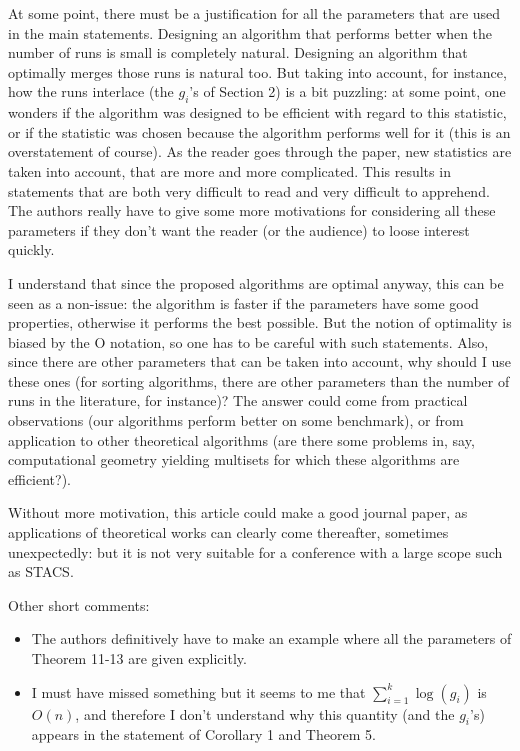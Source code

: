 \begin{appendices}
  At some point, there must be a justification for all the parameters
  that are used in the main statements. Designing an algorithm that
  performs better when the number of runs is small is completely
  natural. Designing an algorithm that optimally merges those runs is
  natural too. But taking into account, for instance, how the runs
  interlace (the $g_i$'s of Section 2) is a bit puzzling: at some point,
  one wonders if the algorithm was designed to be efficient with
  regard to this statistic, or if the statistic was chosen because the
  algorithm performs well for it (this is an overstatement of
  course). As the reader goes through the paper, new statistics are
  taken into account, that are more and more complicated. This results
  in statements that are both very difficult to read and very
  difficult to apprehend. The authors really have to give some more
  motivations for considering all these parameters if they don't want
  the reader (or the audience) to loose interest quickly.

  I understand that since the proposed algorithms are optimal anyway,
  this can be seen as a non-issue: the algorithm is faster if the
  parameters have some good properties, otherwise it performs the best
  possible. But the notion of optimality is biased by the O notation,
  so one has to be careful with such statements. Also, since there are
  other parameters that can be taken into account, why should I use
  these ones (for sorting algorithms, there are other parameters than
  the number of runs in the literature, for instance)? The answer
  could come from practical observations (our algorithms perform
  better on some benchmark), or from application to other theoretical
  algorithms (are there some problems in, say, computational geometry
  yielding multisets for which these algorithms are efficient?).

  Without more motivation, this article could make a good journal
  paper, as applications of theoretical works can clearly come
  thereafter, sometimes unexpectedly: but it is not very suitable for
  a conference with a large scope such as STACS.

  Other short comments:
  \begin{itemize}
  \item The authors definitively have to make an example where all
    the parameters of Theorem 11-13 are given explicitly.
    
  \item I must have missed something but it seems to me that
    $\sum_{i=1}^k \log(g_i)$ is $O(n)$, and therefore I don't understand
    why this quantity (and the $g_i$'s) appears in the statement of
    Corollary 1 and Theorem 5.
    

\end{itemize}
\end{appendices}
